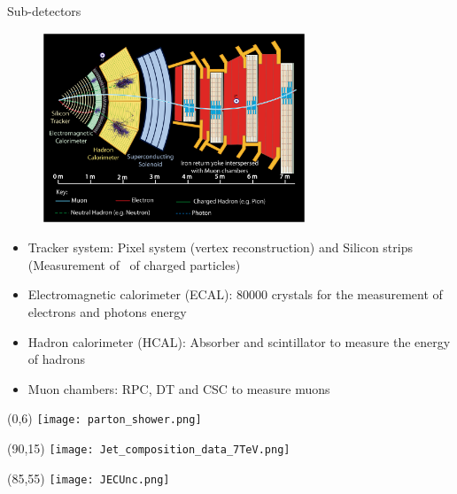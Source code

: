 \begin{frame}{Sub-detectors}
\vspace{-.2cm}
\begin{figure}[!Hhtbp]
  \begin{center}
    \includegraphics[width=0.7\textwidth]{../figs/PictureforPoint5_oct04_allp.jpg}
  \end{center}
\end{figure}
\vspace{-.4cm}
\begin{block}{}
\begin{itemize}\tiny
\item Tracker system: Pixel system (vertex reconstruction) and Silicon strips (Measurement of \pt~of charged particles)
\item Electromagnetic calorimeter (ECAL): 80000 crystals for the measurement of electrons and photons energy
\item Hadron calorimeter (HCAL): Absorber and scintillator to measure the energy of hadrons
\item Muon chambers: RPC, DT and CSC to measure muons \pt
\end{itemize}
\end{block}

\end{frame}


\begin{frame}{}
\vspace{-.2cm}

\begin{textblock}{95}(0,6)
    \texttt{[image: parton\_shower.png]}
\end{textblock}
\begin{textblock}{40}(90,15)
\texttt{[image: Jet\_composition\_data\_7TeV.png]}
\end{textblock}
\begin{textblock}{42}(85,55)
\texttt{[image: JECUnc.png]}
\end{textblock}

\end{frame}


